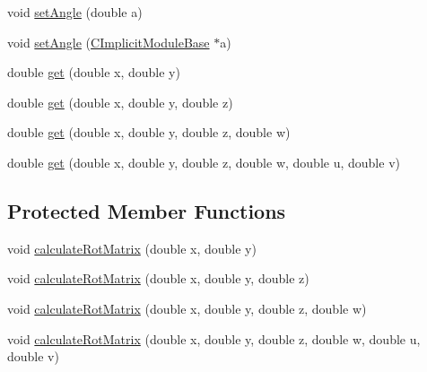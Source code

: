 \begin{DoxyCompactItemize}
\item 
void \hyperlink{classanl_1_1CImplicitRotateDomain_a8bee0c761cbf7920b6fd2cb42fb2b38f}{setAngle} (double a)
\item 
void \hyperlink{classanl_1_1CImplicitRotateDomain_a3b93250d577c8350ddc8381e494605fb}{setAngle} (\hyperlink{classanl_1_1CImplicitModuleBase}{CImplicitModuleBase} $\ast$a)
\item 
double \hyperlink{classanl_1_1CImplicitRotateDomain_a9599a3b576c39197f6807202c7679480}{get} (double x, double y)
\item 
double \hyperlink{classanl_1_1CImplicitRotateDomain_a45697c6d5fcd6d5b551219a5520d0db8}{get} (double x, double y, double z)
\item 
double \hyperlink{classanl_1_1CImplicitRotateDomain_a094b57aa7d2acfbe3c069540a546be0d}{get} (double x, double y, double z, double w)
\item 
double \hyperlink{classanl_1_1CImplicitRotateDomain_a17c9e93ed5a749c490da923c5faf1952}{get} (double x, double y, double z, double w, double u, double v)
\end{DoxyCompactItemize}
\subsection*{Protected Member Functions}
\begin{DoxyCompactItemize}
\item 
void \hyperlink{classanl_1_1CImplicitRotateDomain_a7f52893ebfcbb22ace8830c073113409}{calculateRotMatrix} (double x, double y)
\item 
void \hyperlink{classanl_1_1CImplicitRotateDomain_af442390b1e756deb0f6dd4b49ce53995}{calculateRotMatrix} (double x, double y, double z)
\item 
void \hyperlink{classanl_1_1CImplicitRotateDomain_a4a64050cc38be876a234e4b4c33c3533}{calculateRotMatrix} (double x, double y, double z, double w)
\item 
void \hyperlink{classanl_1_1CImplicitRotateDomain_a59d57e28efeef32a3d30417a210713a9}{calculateRotMatrix} (double x, double y, double z, double w, double u, double v)
\end{DoxyCompactItemize}

